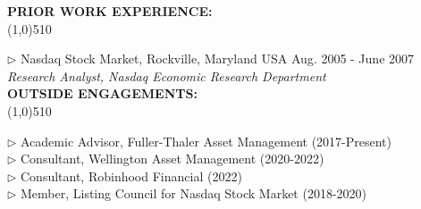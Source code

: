 \documentclass[11pt]{article}
\begin{document}
 




\vskip 0.75cm
\setlength{\parindent}{0in}
{\bf PRIOR WORK EXPERIENCE:\\}
\vskip -0.85cm \line(1,0){510} \\ \vskip -0.35cm

$\triangleright$ Nasdaq Stock Market, Rockville, Maryland USA \hfill Aug. 2005 - June 2007\\
{\em Research Analyst, Nasdaq Economic Research Department}\\

\vskip 0.5cm
\setlength{\parindent}{0in}
{\bf OUTSIDE ENGAGEMENTS:\\}
\vskip -0.85cm \line(1,0){510} \\ \vskip -0.35cm

$\triangleright$ Academic Advisor, Fuller-Thaler Asset Management (2017-Present)\\
$\triangleright$ Consultant, Wellington Asset Management (2020-2022)\\
$\triangleright$ Consultant, Robinhood Financial (2022)\\
$\triangleright$ Member, Listing Council for Nasdaq Stock Market (2018-2020)


\vskip 0.25cm



\end{document}
